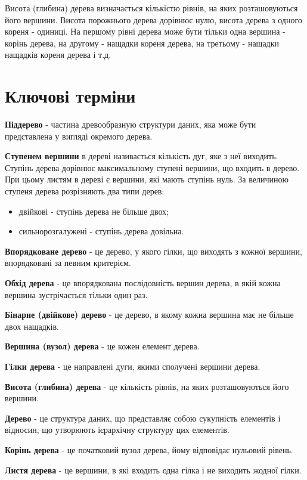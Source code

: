 Висота (глибина) дерева визначається кількістю рівнів, на яких розташовуються його вершини. Висота порожнього дерева дорівнює нулю, висота дерева з одного кореня - одиниці. На першому рівні дерева може бути тільки одна вершина - корінь дерева, на другому - нащадки кореня дерева, на третьому - нащадки нащадків кореня дерева і т.д.


\section{Ключові терміни}
\nopagebreak[4]

\textbf{Піддерево} - частина древообразную структури даних, яка може бути представлена ​​у вигляді окремого дерева.

\textbf{Ступенем вершини} в дереві називається кількість дуг, яке з неї виходить. Ступінь дерева дорівнює максимальному ступені вершини, що входить в дерево. При цьому листям в дереві є вершини, які мають ступінь нуль. За величиною ступеня дерева розрізняють два типи дерев:

\begin{itemize}
\item двійкові - ступінь дерева не більше двох;
\item сильнорозгалужені - ступінь дерева довільна.
\end{itemize}

\textbf{Впорядковане дерево} - це дерево, у якого гілки, що виходять з кожної вершини, впорядковані за певним критерієм.

\textbf{Обхід дерева} - це впорядкована послідовність вершин дерева, в якій кожна вершина зустрічається тільки один раз.


\textbf{Бінарне (двійкове) дерево} - це дерево, в якому кожна вершина має не більше двох нащадків.

\textbf{Вершина (вузол) дерева} - це кожен елемент дерева.

\textbf{Гілки дерева} - це направлені дуги, якими сполучені вершини дерева.

\textbf{Висота (глибина) дерева} - це кількість рівнів, на яких розташовуються його вершини.

\textbf{Дерево} - це структура даних, що представляє собою сукупність елементів і відносин, що утворюють ієрархічну структуру цих елементів.

\textbf{Корінь дерева} - це початковий вузол дерева, йому відповідає нульовий рівень.

\textbf{Листя дерева} - це вершини, в які входить одна гілка і не виходить жодної гілки.

